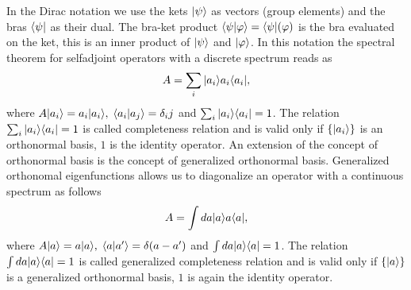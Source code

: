 \documentclass[../1.tex]{subfiles}
\begin{document}
   
    In the Dirac notation we use the kets $| \psi \rangle$ as vectors (group elements) and the bras $\langle \psi |$ as their dual.
    The bra-ket product $\langle \psi | \varphi \rangle = \langle \psi |(\varphi)$ is the bra evaluated on the ket,
    this is an inner product of $| \psi \rangle$ and $| \varphi \rangle$.
    In this notation the spectral theorem for selfadjoint operators with a discrete spectrum reads as
    \[ A = \sum_i | a_i \rangle a_i\langle a_i |, \]
    where $A | a_i \rangle = a_i | a_i \rangle, \; \langle a_i | a_j \rangle = \delta_ij$ and $\sum_i | a_i \rangle \langle a_i | = 1$.
    The relation $\sum_i | a_i \rangle \langle a_i | = 1$ is called completeness relation and
    is valid only if $\{ | a_i \rangle\}$ is an orthonormal basis, $1$ is the identity operator.
    An extension of the concept of orthonormal basis is the concept of generalized orthonormal basis.
    Generalized orthonomal eigenfunctions allows us to diagonalize an operator with a continuous spectrum as follows
    \[ A = \int da | a \rangle a\langle a |, \]
    where $A | a \rangle = a| a \rangle, \; \langle a | a' \rangle = \delta(a-a')$ and $\int da | a \rangle \langle a | = 1$.
    The relation $\int da | a \rangle \langle a | = 1$ is called generalized completeness relation and
    is valid only if $\{ | a \rangle\}$ is a generalized orthonormal basis, $1$ is again the identity operator.
\end{document}
